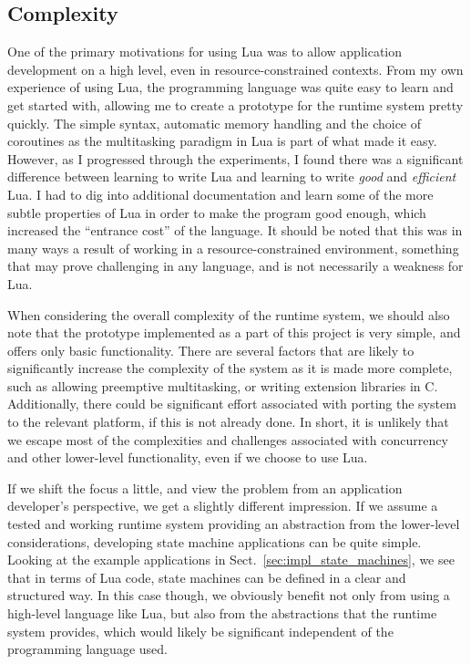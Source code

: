 \subsection{Complexity}
\label{sec:disq_complexity}
One of the primary motivations for using Lua was to allow application development on a high level, even in resource-constrained contexts. From my own experience of using Lua, the programming language was quite easy to learn and get started with, allowing me to create a prototype for the runtime system pretty quickly. The simple syntax, automatic memory handling and the choice of coroutines as the multitasking paradigm in Lua is part of what made it easy. However, as I progressed through the experiments, I found there was a significant difference between learning to write Lua and learning to write \emph{good} and \emph{efficient} Lua. I had to dig into additional documentation and learn some of the more subtle properties of Lua in order to make the program good enough, which increased the ``entrance cost'' of the language. It should be noted that this was in many ways a result of working in a resource-constrained environment, something that may prove challenging in any language, and is not necessarily a weakness for Lua.

\noindent
When considering the overall complexity of the runtime system, we should also note that the prototype implemented as a part of this project is very simple, and offers only basic functionality. There are several factors that are likely to significantly increase the complexity of the system as it is made more complete, such as allowing preemptive multitasking, or writing extension libraries in C. Additionally, there could be significant effort associated with porting the system to the relevant platform, if this is not already done. In short, it is unlikely that we escape most of the complexities and challenges associated with concurrency and other lower-level functionality, even if we choose to use Lua.

\noindent
If we shift the focus a little, and view the problem from an application developer's perspective, we get a slightly different impression. If we assume a tested and working runtime system providing an abstraction from the lower-level considerations, developing state machine applications can be quite simple. Looking at the example applications in Sect.~\ref{sec:impl_state_machines}, we see that in terms of Lua code, state machines can be defined in a clear and structured way. In this case though, we obviously benefit not only from using a high-level language like Lua, but also from the abstractions that the runtime system provides, which would likely be significant independent of the programming language used.


